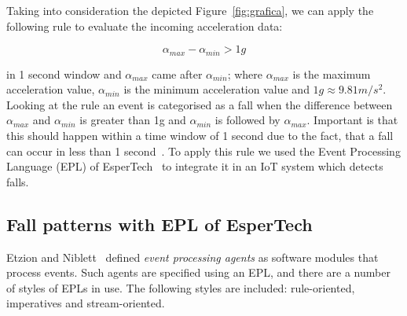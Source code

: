 \documentclass[review]{elsarticle}
\begin{document}
Taking into consideration the depicted Figure~\ref{fig:grafica}, we can apply the following rule to evaluate the incoming acceleration data:

\begin{equation}\label{eq:caida}
 \alpha_{max} - \alpha_{min} > 1g
\end{equation}

in 1 second window and $\alpha_{max}$ came after $\alpha_{min}$; where $\alpha_{max}$ is the maximum acceleration value, 
$\alpha_{min}$ is the minimum acceleration value and $1g\approx9.81m/s^{2}$. Looking at the rule an event is categorised as a fall when the 
difference between $\alpha_{max}$ and $\alpha_{min}$ is greater than 1g and $\alpha_{min}$ is followed by $\alpha_{max}$. 
Important is that this should happen within a time window of 1 second due to the fact, that a fall can occur in less than 1 second~\cite{Luder2009}.
To apply this rule we used the Event Processing Language (EPL) of EsperTech~\cite{Esper:2016} to integrate it in an IoT system which detects falls.

\subsection{Fall patterns with EPL of EsperTech}

Etzion and Niblett~\cite{Etz10} defined \textit{event processing agents} as software modules that process events. Such agents are specified using an 
EPL, and there are a number of styles of EPLs in use. The following styles are included: rule-oriented, imperatives and stream-oriented.

\end{document}
